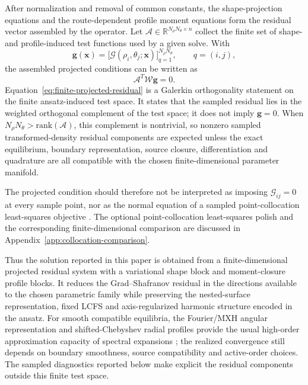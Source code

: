 \documentclass[final, 3p, times]{elsarticle}
\begin{document}
After normalization and removal of common constants, the shape-projection equations and the route-dependent profile moment equations form the residual vector assembled by the operator. Let $\mathcal{A}\in\mathbb{R}^{N_\rho N_\theta\times n}$ collect the finite set of shape- and profile-induced test functions used by a given solve. With
\begin{equation*}
    \mathbf{g}(\mathbf{x})
    =
    \bigl[\mathcal{G}(\rho_i,\theta_j;\mathbf{x})\bigr]_{q=1}^{N_\rho N_\theta},
    \qquad q=(i,j),
\end{equation*}
the assembled projected conditions can be written as
\begin{equation}
    \mathcal{A}^{T}\mathcal{W}\mathbf{g}=0.
    \label{eq:finite-projected-residual}
\end{equation}
Equation~\eqref{eq:finite-projected-residual} is a Galerkin orthogonality statement on the finite ansatz-induced test space. It states that the sampled residual lies in the weighted orthogonal complement of the test space; it does not imply $\mathbf{g}=0$. When $N_\rho N_\theta>\mathrm{rank}(\mathcal{A})$, this complement is nontrivial, so nonzero sampled transformed-density residual components are expected unless the exact equilibrium, boundary representation, source closure, differentiation and quadrature are all compatible with the chosen finite-dimensional parameter manifold.

The projected condition should therefore not be interpreted as imposing $\mathcal{G}_{ij}=0$ at every sample point, nor as the normal equation of a sampled point-collocation least-squares objective \cite{Nocedal2006}. The optional point-collocation least-squares polish and the corresponding finite-dimensional comparison are discussed in Appendix~\ref{app:collocation-comparison}.

Thus the solution reported in this paper is obtained from a finite-dimensional projected residual system with a variational shape block and moment-closure profile blocks. It reduces the Grad--Shafranov residual in the directions available to the chosen parametric family while preserving the nested-surface representation, fixed LCFS and axis-regularized harmonic structure encoded in the ansatz. For smooth compatible equilibria, the Fourier/MXH angular representation and shifted-Chebyshev radial profiles provide the usual high-order approximation capacity of spectral expansions \cite{Trefethen2000}; the realized convergence still depends on boundary smoothness, source compatibility and active-order choices. The sampled diagnostics reported below make explicit the residual components outside this finite test space.
\end{document}

